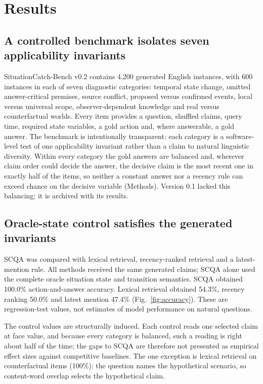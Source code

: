 \section*{Results}

\subsection*{A controlled benchmark isolates seven applicability invariants}

SituationCatch-Bench v0.2 contains 4,200 generated English instances, with 600
instances in each of seven diagnostic categories: temporal state change,
omitted answer-critical premises, source conflict, proposed versus confirmed
events, local versus universal scope, observer-dependent knowledge and real
versus counterfactual worlds. Every item provides a question, shuffled claims,
query time, required state variables, a gold action and, where answerable, a
gold answer. The benchmark is intentionally transparent: each category is a
software-level test of one applicability invariant rather than a claim to
natural linguistic diversity. Within every category the gold answers are
balanced and, wherever claim order could decide the answer, the decisive claim
is the most recent one in exactly half of the items, so neither a constant
answer nor a recency rule can exceed chance on the decisive variable (Methods).
Version 0.1 lacked this balancing; it is archived with its results.

\subsection*{Oracle-state control satisfies the generated invariants}

SCQA was compared with lexical retrieval, recency-ranked retrieval and a
latest-mention rule. All methods received the same generated claims; SCQA alone
used the complete oracle situation state and transition semantics. SCQA obtained
100.0\% action-and-answer accuracy. Lexical retrieval obtained 54.3\%, recency
ranking 50.0\% and latest mention 47.4\% (Fig.~\ref{fig:accuracy}). These are
regression-test values, not estimates of model performance on natural
questions.

The control values are structurally induced. Each control reads one selected
claim at face value, and because every category is balanced, such a reading is
right about half of the time; the gaps to SCQA are therefore not presented as
empirical effect sizes against competitive baselines. The one exception is
lexical retrieval on counterfactual items (100\%): the question names the
hypothetical scenario, so content-word overlap selects the hypothetical claim.

